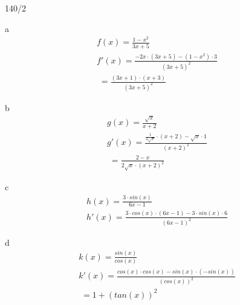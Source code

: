 \begin{exercise}{140/2}
  \item [a]
  \begin{gather*}
    f(x) = \frac{1 - x^2}{3x + 5} \\
    f'(x) = \frac{-2x \cdot (3x + 5) - (1 - x^2) \cdot 3}{(3x + 5)^2} \\
    \;= \frac{(3x + 1) \cdot (x + 3)}{(3x + 5)^2}
  \end{gather*}
  \item [b]
  \begin{gather*}
    g(x) = \frac{\sqrt{x}}{x + 2} \\
    g'(x) = \frac{\frac{1}{2\sqrt{x}} \cdot (x + 2) - \sqrt{x} \cdot 1}{(x + 2)^2} \\
    \;= \frac{2 - x}{2\sqrt{x} \cdot (x + 2)^2}
  \end{gather*}
  \item [c]
  \begin{gather*}
    h(x) = \frac{3 \cdot sin(x)}{6x - 1} \\
    h'(x) = \frac{3 \cdot cos(x) \cdot (6x - 1) - 3 \cdot sin(x) \cdot 6}{(6x - 1)^2}
  \end{gather*}
  \item [d]
  \begin{gather*}
    k(x) = \frac{sin(x)}{cos(x)} \\
    k'(x) = \frac{cos(x) \cdot cos(x) - sin(x) \cdot (-sin(x))}{(cos(x))^2} \\
    \;= 1 + (tan(x))^2
  \end{gather*}
\end{exercise}
